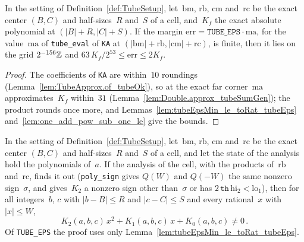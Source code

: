 \begin{lemma}\label{lem:TubeSetup.onGrid_and_bounds_tubeEps_mul_tubeEvalGen}
  \leanok
  In the setting of Definition~\ref{def:TubeSetup}, let~$\mathrm{bm}$, $\mathrm{rb}$, $\mathrm{cm}$
  and~$\mathrm{rc}$ be the exact center $(B, C)$ and half-sizes~$R$ and~$S$ of a cell, and~$K_f$ the
  exact absolute polynomial at $(|B| + R, |C| + S)$. If the margin
  $\mathrm{err} = \mathtt{TUBE\_EPS} \cdot \mathrm{ma}$, for the value~$\mathrm{ma}$ of
  \texttt{tube\_eval} of \texttt{KA} at $(|\mathrm{bm}| + \mathrm{rb}, |\mathrm{cm}| + \mathrm{rc})$,
  is finite, then it lies on the grid $2^{-156}\mathbb{Z}$ and
  $63\, K_f / 2^{53} \le \overline{\mathrm{err}} \le 2 K_f$.
\end{lemma}

\begin{proof}
  \leanok
  The coefficients of \texttt{KA} are within~$10$ roundings (Lemma~\ref{lem:TubeApprox.of_tubeOk}),
  so at the exact far corner~$\mathrm{ma}$ approximates~$K_f$ within~$31$
  (Lemma~\ref{lem:Double.approx_tubeSumGen}); the product rounds once more, and
  Lemmas~\ref{lem:tubeEpsMin_le_toRat_tubeEps} and~\ref{lem:one_add_pow_sub_one_le} give the bounds.
\end{proof}

\begin{lemma}\label{lem:TubeSetup.not_root_of_tubeCellAnalyzeGen}
  \leanok
  In the setting of Definition~\ref{def:TubeSetup}, let~$\mathrm{bm}$, $\mathrm{rb}$, $\mathrm{cm}$
  and~$\mathrm{rc}$ be the exact center $(B, C)$ and half-sizes~$R$ and~$S$ of a cell, and let the
  state of the analysis hold the polynomials of~$a$. If the analysis of the cell, with the products
  of~$\mathrm{rb}$ and~$\mathrm{rc}$, finds it out (\texttt{poly\_sign} gives $Q(W)$ and $Q(-W)$ the
  same nonzero sign~$\sigma$, and gives~$K_2$ a nonzero sign other than~$\sigma$ or has
  $2\,\mathtt{th}\,\mathrm{hi}_2 < \mathrm{lo}_1$), then for all integers~$b$, $c$ with
  $|b - B| \le R$ and $|c - C| \le S$ and every rational~$x$ with $|x| \le W$,
  \[
    K_2(a, b, c)\, x^2 + K_1(a, b, c)\, x + K_0(a, b, c) \ne 0\,.
  \]
  Of \texttt{TUBE\_EPS} the proof uses only Lemma~\ref{lem:tubeEpsMin_le_toRat_tubeEps}.
\end{lemma}

